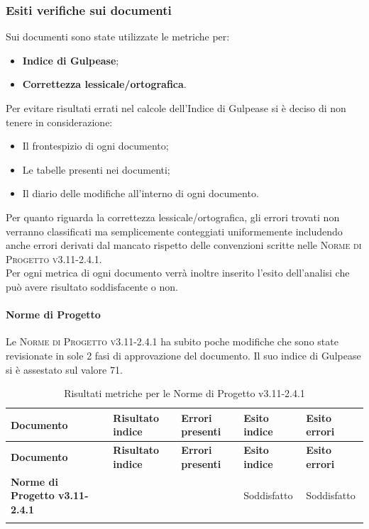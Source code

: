 \subsubsection{Esiti verifiche sui documenti}
\label{sub:esiti_verifiche_sui_documenti}
Sui documenti sono state utilizzate le metriche per:
    \begin{itemize}
        \item \textbf{Indice di Gulpease};
        \item \textbf{Correttezza lessicale/ortografica}.
    \end{itemize}
Per evitare risultati errati nel calcole dell'Indice di Gulpease si è deciso di non tenere in considerazione:
    \begin{itemize}
        \item Il frontespizio di ogni documento;
        \item Le tabelle presenti nei documenti;
        \item Il diario delle modifiche all'interno di ogni documento.
    \end{itemize}
Per quanto riguarda la correttezza lessicale/ortografica, gli errori trovati non verranno classificati ma semplicemente conteggiati uniformemente includendo anche errori derivati dal mancato rispetto delle convenzioni scritte nelle \textsc{Norme di Progetto v3.11-2.4.1}.
\\ Per ogni metrica di ogni documento verrà inoltre inserito l'esito dell'analisi che può avere risultato soddisfacente o non.

\paragraph{Norme di Progetto}
\label{sub:norme_di_progetto}
Le \textsc{Norme di Progetto v3.11-2.4.1} ha subito poche modifiche che sono state revisionate in sole 2 fasi di approvazione del documento.
Il suo indice di Gulpease si è assestato sul valore 71.

\renewcommand{\arraystretch}{2} %
\begin{longtable}[H]{>{\centering\bfseries}m{6cm} >{\centering}m{2cm} >{\centering}m{2.5cm} >{\centering}m{2.5cm} >{\centering\arraybackslash}m{2.5cm}}  
  \rowcolor{lightgray}
  {\textbf{Documento}} & {\textbf{Risultato indice}} & {\textbf{Errori presenti}} & {\textbf{Esito indice}} & {\textbf{Esito errori}}  \\
  \endfirsthead%
  \rowcolor{lightgray}
  {\textbf{Documento}} & {\textbf{Risultato indice}} & {\textbf{Errori presenti}} & {\textbf{Esito indice}} & {\textbf{Esito errori}}  \\
  \endhead%
  \textbf{Norme di Progetto v3.11-2.4.1} & 71               & 0               & Soddisfatto & Soddisfatto \\
  \caption{Risultati metriche per le Norme di Progetto v3.11-2.4.1}
  \label{tab:my-table}
\end{longtable}

